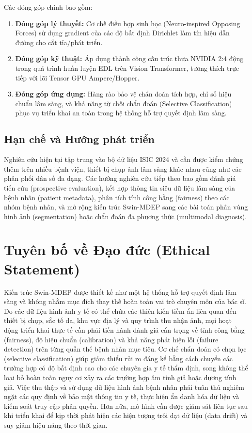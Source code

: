 \documentclass[11pt, a4paper]{article}
\begin{document}
Các đóng góp chính bao gồm:
\begin{enumerate}
    \item \textbf{Đóng góp lý thuyết:} Cơ chế điều hợp sinh học (Neuro-inspired Opposing Forces) sử dụng gradient của các độ bất định Dirichlet làm tín hiệu dẫn đường cho cắt tỉa/phát triển.
    \item \textbf{Đóng góp kỹ thuật:} Áp dụng thành công cấu trúc thưa NVIDIA 2:4 động trong quá trình huấn luyện EDL trên Vision Transformer, tương thích trực tiếp với lõi Tensor GPU Ampere/Hopper.
    \item \textbf{Đóng góp ứng dụng:} Hàng rào bảo vệ chẩn đoán tích hợp, chỉ số hiệu chuẩn lâm sàng, và khả năng từ chối chẩn đoán (Selective Classification) phục vụ triển khai an toàn trong hệ thống hỗ trợ quyết định lâm sàng.
\end{enumerate}

\subsection{Hạn chế và Hướng phát triển}\label{subsec:limitations}

Nghiên cứu hiện tại tập trung vào bộ dữ liệu ISIC 2024 và cần được kiểm chứng thêm trên nhiều bệnh viện, thiết bị chụp ảnh lâm sàng khác nhau cũng như các phân phối dân số đa dạng. Các hướng nghiên cứu tiếp theo bao gồm đánh giá tiến cứu (prospective evaluation), kết hợp thông tin siêu dữ liệu lâm sàng của bệnh nhân (patient metadata), phân tích tính công bằng (fairness) theo các nhóm bệnh nhân, và mở rộng kiến trúc Swin-MDEP sang các bài toán phân vùng hình ảnh (segmentation) hoặc chẩn đoán đa phương thức (multimodal diagnosis).

\section{Tuyên bố về Đạo đức (Ethical Statement)}\label{sec:ethics}

Kiến trúc Swin-MDEP được thiết kế như một hệ thống hỗ trợ quyết định lâm sàng và không nhằm mục đích thay thế hoàn toàn vai trò chuyên môn của bác sĩ. Do các dữ liệu hình ảnh y tế có thể chứa các thiên kiến tiềm ẩn liên quan đến thiết bị chụp, sắc tố da, khu vực địa lý và quy trình thu nhận ảnh, mọi hoạt động triển khai thực tế cần phải tiến hành đánh giá cẩn trọng về tính công bằng (fairness), độ hiệu chuẩn (calibration) và khả năng phát hiện lỗi (failure detection) trên từng quần thể bệnh nhân mục tiêu. Cơ chế chẩn đoán có chọn lọc (selective classification) giúp giảm thiểu rủi ro đáng kể bằng cách chuyển các trường hợp có độ bất định cao cho các chuyên gia y tế thẩm định, song không thể loại bỏ hoàn toàn nguy cơ xảy ra các trường hợp âm tính giả hoặc dương tính giả. Việc thu thập và sử dụng dữ liệu hình ảnh bệnh nhân phải tuân thủ nghiêm ngặt các quy định về bảo mật thông tin y tế, thực hiện ẩn danh hóa dữ liệu và kiểm soát truy cập phân quyền. Hơn nữa, mô hình cần được giám sát liên tục sau khi triển khai để kịp thời phát hiện các hiện tượng trôi dạt dữ liệu (data drift) và suy giảm hiệu năng theo thời gian.
\end{document}
